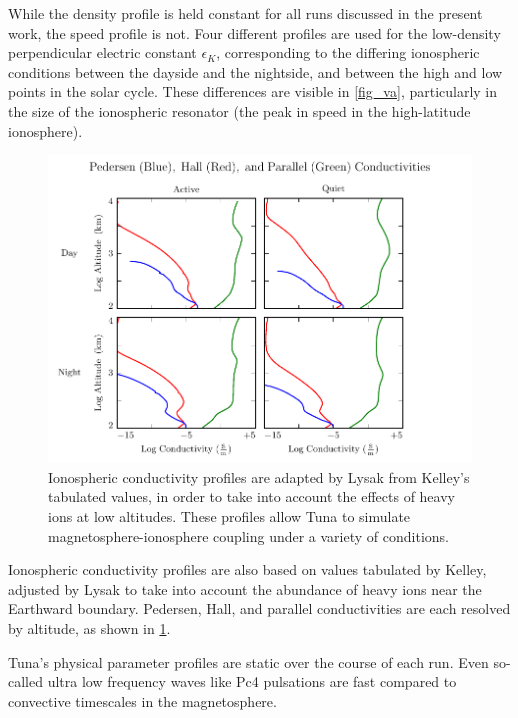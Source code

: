 While the density profile is held constant for all runs discussed in the
present work, the \Alfven speed profile is not. Four different profiles are
used for the low-density perpendicular electric constant $\epsilon_K$,
corresponding to the differing ionospheric conditions between the dayside and
the nightside, and between the high and low points in the solar cycle. These
differences are visible in \cref{fig_va}, particularly in the size of the
ionospheric \Alfven resonator (the peak in \Alfven speed in the high-latitude
ionosphere). 


\begin{figure}[!htb]
  \centering
  \includegraphics[width=\textwidth]{figures/sigma.pdf}
  \caption[Ionospheric Conductivity Profiles]{
    Ionospheric conductivity profiles are adapted by Lysak\cite{lysak_2013}
    from Kelley's tabulated values\cite{kelley_1989}, in order to take into
    account the effects of heavy ions at low altitudes. These profiles allow
    Tuna to simulate magnetosphere-ionosphere coupling under a variety of
    conditions. 
  }
  \label{fig_sigma}
\end{figure}

Ionospheric conductivity profiles are also based on values tabulated by Kelley,
adjusted by Lysak\cite{lysak_2013} to take into account the abundance of heavy
ions near the Earthward boundary. Pedersen, Hall, and parallel conductivities
are each resolved by altitude, as shown in \cref{fig_sigma}. 

Tuna's physical parameter profiles are static over the course of each run. Even
so-called ultra low frequency waves like Pc4 pulsations are fast compared to
convective timescales in the magnetosphere. 

